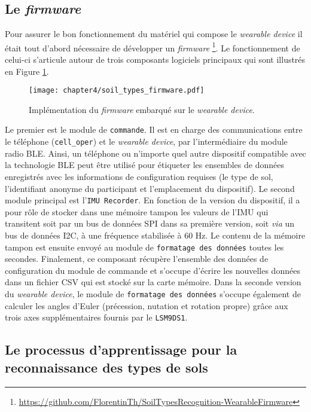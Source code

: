 \subsection{Le \textit{firmware}}

Pour assurer le bon fonctionnement du matériel qui compose le \textit{wearable device} il était tout d'abord nécessaire de développer un \textit{firmware} \footnote{\url{https://github.com/FlorentinTh/SoilTypesRecognition-WearableFirmware}}. Le fonctionnement de celui-ci s'articule autour de trois composants logiciels principaux qui sont illustrés en Figure \ref{fig:soil_types_firmware}.

\begin{figure}[t]
	\centering
	\texttt{[image: chapter4/soil\_types\_firmware.pdf]}
        \caption{Implémentation du \textit{firmware} embarqué sur le \textit{wearable device}.}
	\label{fig:soil_types_firmware}
\end{figure}

Le premier est le module de \texttt{commande}. Il est en charge des communications entre le téléphone (\texttt{cell\_oper}) et le \textit{wearable device}, par l'intermédiaire du module radio \acs{BLE}. Ainsi, un téléphone ou n'importe quel autre dispositif compatible avec la technologie \acs{BLE} peut être utilisé pour étiqueter les ensembles de données enregistrés avec les informations de configuration requises (le type de sol, l'identifiant anonyme du participant et l'emplacement du dispositif). Le second module principal est l'\texttt{\acs{IMU} Recorder}. En fonction de la version du dispositif, il a pour rôle de stocker dans une mémoire tampon les valeurs de l'\acs{IMU} qui transitent soit par un bus de données \ac{SPI} dans sa première version, soit \textit{via} un bus de données \ac{I2C}, à une fréquence stabilisée à 60 Hz. Le contenu de la mémoire tampon est ensuite envoyé au module de \texttt{formatage des données} toutes les secondes. Finalement, ce composant récupère l'ensemble des données de configuration du module de commande et s'occupe d'écrire les nouvelles données dans un fichier \ac{CSV} qui est stocké sur la carte mémoire. Dans la seconde version du \textit{wearable device}, le module de \texttt{formatage des données} s'occupe également de calculer les angles d'Euler (précession, nutation et rotation propre) grâce aux trois axes supplémentaires fournis par le \texttt{LSM9DS1}.

\subsection{Le processus d'apprentissage pour la reconnaissance des types de sols}
\label{sec:learn}

